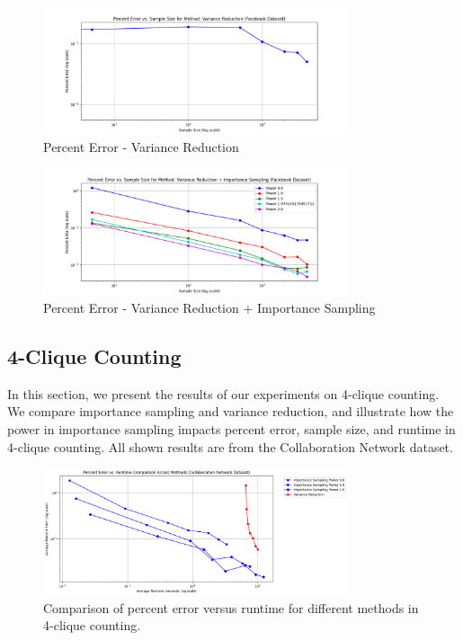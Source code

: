 \documentclass[11pt]{article}
\begin{document}
\begin{figure}[H]
    \centering
    \includegraphics[width=0.8\textwidth]{plots/percent-errors/percent_error_Variance Reduction.png}
    \caption{Percent Error - Variance Reduction}
    \label{fig:percent_error_variance}
\end{figure}

\begin{figure}[H]
    \centering
    \includegraphics[width=0.8\textwidth]{plots/percent-errors/percent_error_Variance Reduction + Importance Sampling.png}
    \caption{Percent Error - Variance Reduction + Importance Sampling}
    \label{fig:percent_error_variance_importance}
\end{figure}

\subsection{4-Clique Counting}

In this section, we present the results of our experiments on 4-clique counting.
We compare importance sampling and variance reduction, and illustrate how the power in importance sampling impacts percent error, sample size, and runtime in 4-clique counting.
All shown results are from the Collaboration Network dataset.

\begin{figure}[H]
    \centering
    \includegraphics[width=0.8\textwidth]{plots/4-clique/comparison/percent_error_vs_runtime_comparison.png}
    \caption{Comparison of percent error versus runtime for different methods in 4-clique counting.}
    \label{fig:4_clique_percent_error_runtime_comparison}
\end{figure}
\end{document}
